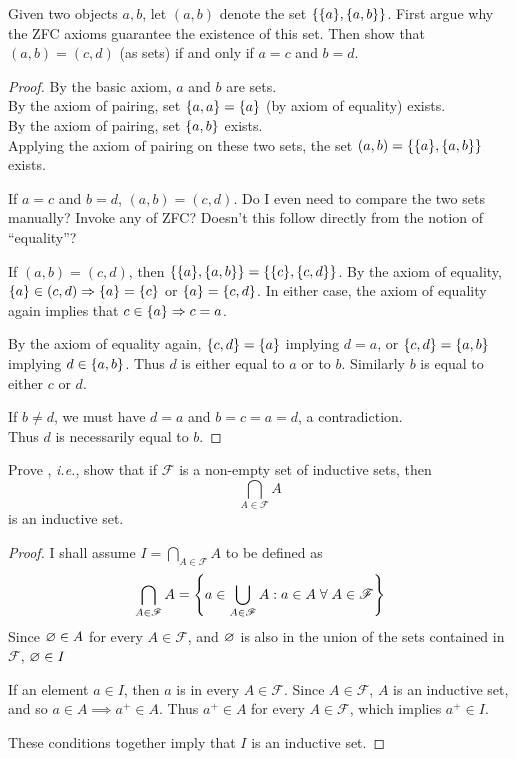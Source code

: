 \documentclass[12pt]{article}
\begin{document}
\begin{problem} \label{prob:zfc:ordered_pair}
    Given two objects $a, b$, let $(a, b)$ denote the set $\set{\set{a}, \set{a, b}}$.
    First argue why the ZFC axioms guarantee the existence of this set.
    Then show that $(a, b) = (c, d)$ (as sets) if and only if $a = c$ and $b = d$.
\end{problem}

\begin{proof}
    By the basic axiom, $a$ and $b$ are sets. \\
    By the axiom of pairing, set $\set{a, a} = \set{a}$ (by axiom of equality) exists. \\
    By the axiom of pairing, set $\set{a, b}$ exists. \\
    Applying the axiom of pairing on these two sets, the set $(a, b) = \set{\{a}, \set{a, b}\}$ exists.

    If $a = c$ and $b = d$, $(a, b) = (c, d)$. \textcolor{exercise}{Do I even need to compare the two sets manually? Invoke any of ZFC? Doesn't this follow directly from the notion of ``equality''?}
    
    If $(a, b) = (c, d)$, then $\set{\{a}, \set{a, b}\} = \set{\{c}, \set{c, d}\}$. By the axiom of equality, $\set{a} \in (c, d) \implies \set{a} = \set{c}$ or $\set{a} = \set{c, d}$. In either case, the axiom of equality again implies that $c \in \set{a} \implies c = a$.

    By the axiom of equality again, $\set{c, d} = \set{a}$ implying $d = a$, or $\set{c, d} = \set{a, b}$ implying $d \in \set{a, b}$. Thus $d$ is either equal to $a$ or to $b$. Similarly $b$ is equal to either $c$ or $d$.

    If $b \neq d$, we must have $d = a$ and $b = c = a = d$, a contradiction. \\
    Thus $d$ is necessarily equal to $b$.
\end{proof}

\begin{problem} \label{prob:zfc:inductive_intersection}
    Prove , \textit{i.e.}, show that if $\mathscr{F}$ is a non-empty set of inductive sets, then \[
        \bigcap_{A \in \mathscr{F}} A
    \]
    is an inductive set.
\end{problem}

\begin{proof}
    I shall assume $I = \bigcap_{A \in \mathscr{F}}A$ to be defined as
    \[
        \bigcap_{A \in \mathscr{F}}A  = \set{a \in \bigcup_{A \in \mathscr{F}}A : a \in A \;\forall\; A \in \mathscr{F}}
    \]
    Since $\varnothing \in A$ for every $A \in \mathscr{F}$, and $\varnothing$ is also in the union of the sets contained in $\mathscr{F}$, $\varnothing \in I$

    If an element $a \in I$, then $a$ is in every $A \in \mathscr{F}$. Since $A \in \mathscr{F}$, $A$ is an inductive set, and so $a \in A \implies a^{+} \in A$. Thus $a^{+} \in A$ for every $A \in \mathscr{F}$, which implies $a^{+} \in I$.

    These conditions together imply that $I$ is an inductive set.
\end{proof}
\end{document}
